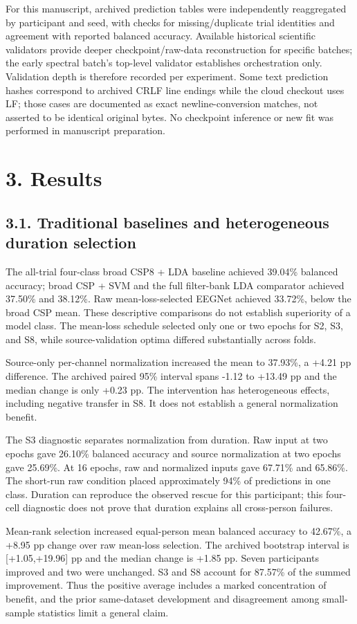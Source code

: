 \documentclass[11pt]{article}
\begin{document}
For this manuscript, archived prediction tables were independently reaggregated by participant and seed, with checks for missing/duplicate trial identities and agreement with reported balanced accuracy. Available historical scientific validators provide deeper checkpoint/raw-data reconstruction for specific batches; the early spectral batch's top-level validator establishes orchestration only. Validation depth is therefore recorded per experiment. Some text prediction hashes correspond to archived CRLF line endings while the cloud checkout uses LF; those cases are documented as exact newline-conversion matches, not asserted to be identical original bytes. No checkpoint inference or new fit was performed in manuscript preparation.

\section*{3. Results}
\subsection*{3.1. Traditional baselines and heterogeneous duration selection}
The all-trial four-class broad CSP8 + LDA baseline achieved 39.04\% balanced accuracy; broad CSP + SVM and the full filter-bank LDA comparator achieved 37.50\% and 38.12\%. Raw mean-loss-selected EEGNet achieved 33.72\%, below the broad CSP mean. These descriptive comparisons do not establish superiority of a model class. The mean-loss schedule selected only one or two epochs for S2, S3, and S8, while source-validation optima differed substantially across folds.

Source-only per-channel normalization increased the mean to 37.93\%, a +4.21 pp difference. The archived paired 95\% interval spans -1.12 to +13.49 pp and the median change is only +0.23 pp. The intervention has heterogeneous effects, including negative transfer in S8. It does not establish a general normalization benefit.

The S3 diagnostic separates normalization from duration. Raw input at two epochs gave 26.10\% balanced accuracy and source normalization at two epochs gave 25.69\%. At 16 epochs, raw and normalized inputs gave 67.71\% and 65.86\%. The short-run raw condition placed approximately 94\% of predictions in one class. Duration can reproduce the observed rescue for this participant; this four-cell diagnostic does not prove that duration explains all cross-person failures.

Mean-rank selection increased equal-person mean balanced accuracy to 42.67\%, a +8.95 pp change over raw mean-loss selection. The archived bootstrap interval is [+1.05,+19.96] pp and the median change is +1.85 pp. Seven participants improved and two were unchanged. S3 and S8 account for 87.57\% of the summed improvement. Thus the positive average includes a marked concentration of benefit, and the prior same-dataset development and disagreement among small-sample statistics limit a general claim.
\end{document}
